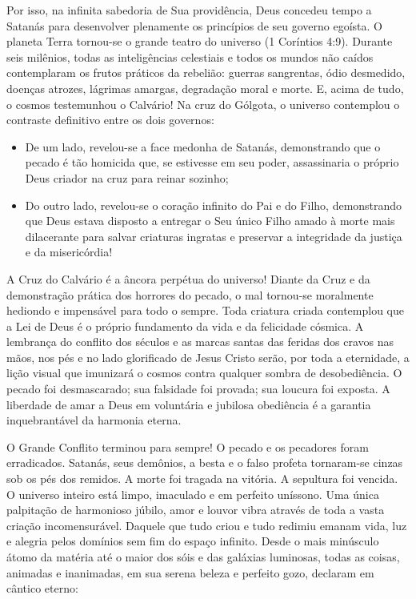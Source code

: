 \documentclass[11pt,a4paper,openany]{book}
\begin{document}
Por isso, na infinita sabedoria de Sua providência, Deus concedeu tempo a Satanás para desenvolver plenamente os princípios de seu governo egoísta. O planeta Terra tornou-se o grande teatro do universo (1 Coríntios 4:9).
Durante seis milênios, todas as inteligências celestiais e todos os mundos não caídos contemplaram os frutos práticos da rebelião: guerras sangrentas, ódio desmedido, doenças atrozes, lágrimas amargas, degradação moral e morte.
E, acima de tudo, o cosmos testemunhou o Calvário! Na cruz do Gólgota, o universo contemplou o contraste definitivo entre os dois governos:
\begin{itemize}
  \item De um lado, revelou-se a face medonha de Satanás, demonstrando que o pecado é tão homicida que, se estivesse em seu poder, assassinaria o próprio Deus criador na cruz para reinar sozinho;
  \item Do outro lado, revelou-se o coração infinito do Pai e do Filho, demonstrando que Deus estava disposto a entregar o Seu único Filho amado à morte mais dilacerante para salvar criaturas ingratas e preservar a integridade da justiça e da misericórdia!
\end{itemize}


A Cruz do Calvário é a âncora perpétua do universo!
Diante da Cruz e da demonstração prática dos horrores do pecado, o mal tornou-se moralmente hediondo e impensável para todo o sempre. Toda criatura criada contemplou que a Lei de Deus é o próprio fundamento da vida e da felicidade cósmica. A lembrança do conflito dos séculos e as marcas santas das feridas dos cravos nas mãos, nos pés e no lado glorificado de Jesus Cristo serão, por toda a eternidade, a lição visual que imunizará o cosmos contra qualquer sombra de desobediência. O pecado foi desmascarado; sua falsidade foi provada; sua loucura foi exposta. A liberdade de amar a Deus em voluntária e jubilosa obediência é a garantia inquebrantável da harmonia eterna.

O Grande Conflito terminou para sempre!
O pecado e os pecadores foram erradicados.
Satanás, seus demônios, a besta e o falso profeta tornaram-se cinzas sob os pés dos remidos.
A morte foi tragada na vitória.
A sepultura foi vencida.
O universo inteiro está limpo, imaculado e em perfeito uníssono.
Uma única palpitação de harmonioso júbilo, amor e louvor vibra através de toda a vasta criação incomensurável.
Daquele que tudo criou e tudo redimiu emanam vida, luz e alegria pelos domínios sem fim do espaço infinito.
Desde o mais minúsculo átomo da matéria até o maior dos sóis e das galáxias luminosas, todas as coisas, animadas e inanimadas, em sua serena beleza e perfeito gozo, declaram em cântico eterno:
\end{document}
